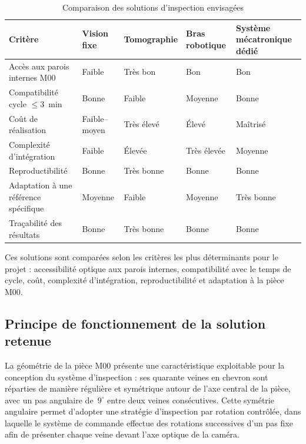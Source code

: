 \begin{table}[htbp]
\caption{Comparaison des solutions d'inspection envisagées}
\label{tab:comparaison_solutions}
\centering
\small
\renewcommand{\arraystretch}{1.4}
\begin{tabular}{|p{4cm}|>{\centering\arraybackslash}p{2.2cm}|>{\centering\arraybackslash}p{2.5cm}|>{\centering\arraybackslash}p{2.2cm}|>{\centering\arraybackslash}p{3cm}|}
\hline
\rowcolor{navyblue}
\textbf{\color{white}Critère} & \textbf{\color{white}Vision fixe} & \textbf{\color{white}Tomographie} & \textbf{\color{white}Bras robotique} & \textbf{\color{white}Système mécatronique dédié} \\
\hline
Accès aux parois internes M00 & Faible & Très bon & Bon & Bon \\
\hline
Compatibilité cycle $\leq 3$~min & Bonne & Faible & Moyenne & Bonne \\
\hline
Coût de réalisation & Faible–moyen & Très élevé & Élevé & Maîtrisé \\
\hline
Complexité d'intégration & Faible & Élevée & Très élevée & Moyenne \\
\hline
Reproductibilité & Bonne & Très bonne & Bonne & Bonne \\
\hline
Adaptation à une référence spécifique & Moyenne & Faible & Moyenne & Très bonne \\
\hline
Traçabilité des résultats & Bonne & Très bonne & Bonne & Bonne \\
\hline
\end{tabular}
\end{table}


Ces solutions sont comparées selon les critères les plus déterminants pour le projet : 
accessibilité optique aux parois internes, compatibilité avec le temps de cycle, coût, complexité d'intégration,
 reproductibilité et adaptation à la pièce M00.

\subsection{Principe de fonctionnement de la solution retenue}

La géométrie de la pièce M00 présente une caractéristique exploitable pour la conception
du système d'inspection : ses quarante veines en chevron sont réparties de manière régulière
et symétrique autour de l'axe central de la pièce, avec un pas angulaire de~$9^{\circ}$ entre
deux veines consécutives. Cette symétrie angulaire permet d'adopter une stratégie
d'inspection par rotation contrôlée, dans laquelle le système de commande effectue des
rotations successives d'un pas fixe afin de présenter chaque veine devant l'axe optique
de la caméra.


